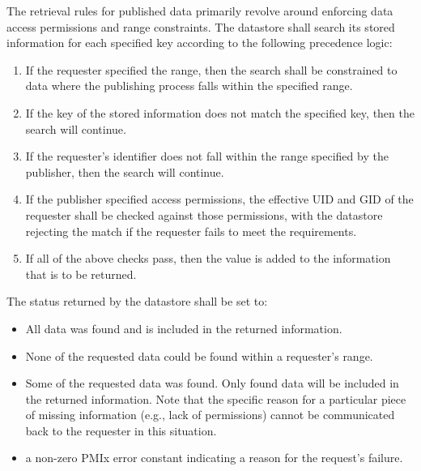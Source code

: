 The retrieval rules for published data primarily revolve around enforcing data access permissions and range constraints. The datastore shall search its stored information for each specified key according to the following precedence logic:

\begin{enumerate}
    \item If the requester specified the range, then the search shall be constrained to data where the publishing process falls within the specified range.

    \item If the key of the stored information does not match the specified key, then the search will continue.

    \item If the requester's identifier does not fall within the range specified by the publisher, then the search will continue.

    \item If the publisher specified access permissions, the effective \ac{UID} and \ac{GID} of the requester shall be checked against those permissions, with the datastore rejecting the match if the requester fails to meet the requirements.

    \item If all of the above checks pass, then the value is added to the information that is to be returned.
\end{enumerate}

The status returned by the datastore shall be set to:

\begin{itemize}
\item {} All data was found and is included in the returned information.

\item {} None of the requested data could be found within a requester's range.

\item {} Some of the requested data was found.
Only found data will be included in the returned information. Note that the specific reason for a particular piece of missing information (e.g., lack of permissions) cannot be communicated back to the requester in this situation.

\item a non-zero \ac{PMIx} error constant indicating a reason for the request's failure.
\end{itemize}

